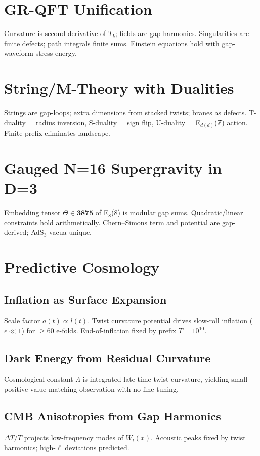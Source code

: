 \documentclass[11pt]{article}
\begin{document}
\section{GR-QFT Unification}
Curvature is second derivative of $T_k$; fields are gap harmonics. Singularities are finite defects; path integrals finite sums. Einstein equations hold with gap-waveform stress-energy.

\section{String/M-Theory with Dualities}
Strings are gap-loops; extra dimensions from stacked twists; branes as defects. T-duality = radius inversion, S-duality = sign flip, U-duality = E$_{d(d)}$(ℤ) action. Finite prefix eliminates landscape.

\section{Gauged N=16 Supergravity in D=3}
Embedding tensor $\Theta \in \mathbf{3875}$ of E$_8$(8) is modular gap sums. Quadratic/linear constraints hold arithmetically. Chern–Simons term and potential are gap-derived; AdS$_3$ vacua unique.

\section{Predictive Cosmology}

\subsection{Inflation as Surface Expansion}
Scale factor $a(t) \propto l(t)$. Twist curvature potential drives slow-roll inflation ($\epsilon \ll 1$) for $\ge 60$ e-folds. End-of-inflation fixed by prefix $T=10^{10}$.

\subsection{Dark Energy from Residual Curvature}
Cosmological constant $\Lambda$ is integrated late-time twist curvature, yielding small positive value matching observation with no fine-tuning.

\subsection{CMB Anisotropies from Gap Harmonics}
$\Delta T/T$ projects low-frequency modes of $W_l(x)$. Acoustic peaks fixed by twist harmonics; high-$\ell$ deviations predicted.
\end{document}
